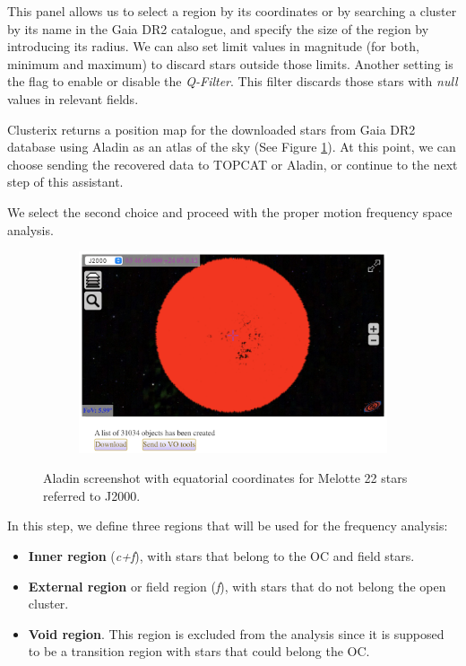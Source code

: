 \documentclass[11pt, a4paper, english]{book}
\begin{document}
This panel allows us to select a region by its coordinates or by searching a cluster by its name in the Gaia DR2 catalogue,
and specify the size of the region by introducing its radius.
We can also set limit values in magnitude (for both, minimum and maximum) to discard stars outside those limits.
Another setting is the flag to enable or disable the \emph{Q-Filter}.
This filter discards those stars with \emph{null} values in relevant fields.

Clusterix returns a position map for the downloaded stars from Gaia DR2 database using Aladin \cite{bonnarel2000aladin} as an atlas of the sky
(See Figure \ref{fig:aladin_melotte_22}).
At this point, we can choose sending the recovered data to TOPCAT or Aladin, or continue to the next step of this assistant.

We select the second choice and proceed with the proper motion frequency space analysis.

\begin{figure}[htbp]
  \centering
  \begin{subfigure}{0.9\textwidth}
    \centering
    \includegraphics[width=\textwidth]{../figures/clusterix/clusterix_aladin_selection_melotte_22.png}
  \end{subfigure}
  \caption{Aladin screenshot with equatorial coordinates for Melotte 22 stars referred to J2000.}
  \label{fig:aladin_melotte_22}
\end{figure}

In this step, we define three regions that will be used for the frequency analysis:

\begin{itemize}
  \item \textbf{Inner region} (\emph{c+f}), with stars that belong to the OC and field stars.
  \item \textbf{External region} or field region (\emph{f}), with stars that do not belong the open cluster.
  \item \textbf{Void region}. This region is excluded from the analysis since it is supposed to be a transition region with stars that could belong the OC.
\end{itemize}
\end{document}
